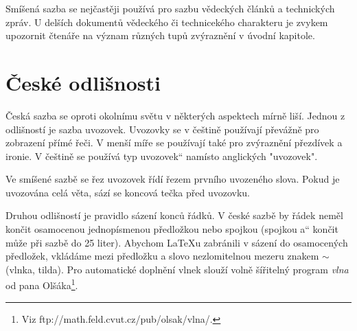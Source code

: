 \documentclass[a4paper, 11pt, twocolumn]{article}
\newcommand{\czuv}[1]{\quotedblbase #1\textquotedblleft}
\begin{document}
    
    Smíšená sazba se nejčastěji používá pro sazbu vědeckých článků a technických zpráv.
    U delších dokumentů vědeckého či technicekého charakteru je zvykem
    upozornit čtenáře na význam různých tupů zvýraznění v úvodní kapitole.  
    \section{České odlišnosti}
    Česká sazba se oproti okolnímu světu v některých aspektech mírně
    liší. Jednou z odlišností je sazba uvozovek. Uvozovky se v češtině
    používají převážně pro zobrazení přímé řeči. V menší míře se používají
    také pro zvýraznění přezdívek a ironie. V češtině se používá \czuv{typ
    uvozovek} namísto anglických "uvozovek".
    
    
    Ve smíšené sazbě se řez uvozovek řídí řezem prvního uvozeného slova.
    Pokud je uvozována celá věta, sází se koncová tečka před uvozovku.
    

    Druhou odlišností je pravidlo sázení konců řádků. V české sazbě by
    řádek neměl končit osamocenou jednopísmenou předložkou nebo spojkou
    (spojkou \czuv{a} končit může při sazbě do 25 liter). Abychom
    \LaTeX u zabránili v sázení do osamocených předložek, vkládáme
    mezi předložku a slovo nezlomitelnou mezeru znakem $\sim$ (vlnka, tilda).
    Pro automatické doplnění vlnek slouží volně šířitelný program
    \emph{vlna} od pana Olšáka\footnote{Viz ftp://math.feld.cvut.cz/pub/olsak/vlna/.}.    
\end{document}
